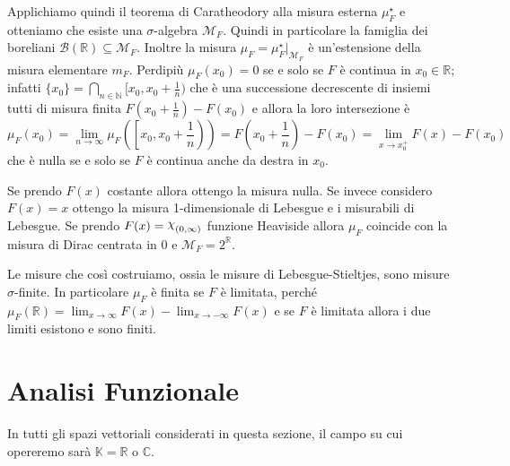 Applichiamo quindi il teorema di Caratheodory alla misura esterna
\(\mu^\star_F\) e otteniamo che esiste una \(\sigma\)-algebra \(\mathcal{M}_F\).
Quindi in particolare la famiglia dei boreliani \(\mathcal{B}(\mathbb{R})
\subseteq \mathcal{M}_F\). Inoltre la misura \(\mu_F =
\mu^\star_F|_{\mathcal{M}_F}\) è un'estensione della misura elementare \(m_F\).
Perdipiù \(\mu_F{(x_{0})} = 0\) se e solo se \(F\) è continua in \(x_{0} \in
\mathbb{R}\); infatti \(\{x_{0}\} = \bigcap_{n \in \mathbb{N}} [x_{0}, x_{0} +
\frac{1}{n})\) che è una successione decrescente di insiemi tutti di misura
finita \(F{(x_{0} + \frac{1}{n})} - F{(x_{0})}\) e allora la loro intersezione è  
\[
    \mu_F{(x_{0})} = \lim_{n \to \infty} \mu_F{\left(\left[x_{0}, x_{0} +
        \frac{1}{n}\right)\right)} =
    F{\left(x_{0} + \frac{1}{n}\right)} - F{(x_{0})} = \lim_{x \to x_{0}^{+}} F{(x)} -
    F{(x_{0})}
\]
che è nulla se e solo se \(F\) è continua anche da destra in \(x_{0}\).

Se prendo \(F{(x)}\) costante allora ottengo la misura nulla. Se invece
considero \(F{(x)} = x\) ottengo la misura 1-dimensionale di Lebesgue e i misurabili di
Lebesgue. Se prendo \(F{(x)} = \rchi_{(0, \infty)} \) funzione Heaviside allora
\(\mu_F\) coincide con la misura di Dirac centrata in \(0\) e \(\mathcal{M}_F =
2^{\mathbb{R}}\).

Le misure che così costruiamo, ossia le misure di Lebesgue-Stieltjes, sono
misure \(\sigma\)-finite. In particolare \(\mu_F\) è finita se \(F\) è limitata,
perché \(\mu_F{(\mathbb{R})} = \lim_{x \to \infty} F{(x)} - \lim_{x \to -\infty}
F{(x)}\) e se \(F\) è limitata allora i due limiti esistono e sono finiti.

\newpage

\section{Analisi Funzionale}
In tutti gli spazi vettoriali considerati in questa sezione, il campo su cui
opereremo sarà \(\mathbb{K} = \mathbb{R}\) o \(\mathbb{C}\).
